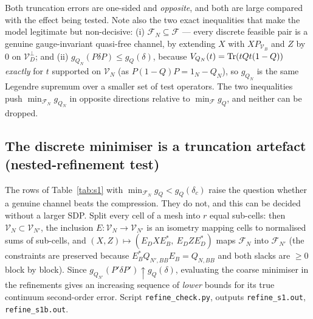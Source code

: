 \documentclass[11pt]{article}
\begin{document}
\noindent Both truncation errors are one-sided and \emph{opposite}, and both are large compared
with the effect being tested.  Note also the two exact inequalities that make the model legitimate
but non-decisive: (i) $\mathcal F_N\subseteq\mathcal F$ --- every discrete feasible pair is a genuine
gauge-invariant quasi-free channel, by extending $X$ with $XP_{\mathcal V_B}$ and $Z$ by $0$ on
$\mathcal V_D^\perp$; and (ii) $g_{Q_N}(P\delta P)\le g_Q(\delta)$, because
$V_{Q_N}(t)=\operatorname{Tr}(tQt(1-Q))$ \emph{exactly} for $t$ supported on $\mathcal V_N$ (as
$P(1-Q)P=1_N-Q_N$), so $g_{Q_N}$ is the same Legendre supremum over a smaller set of test
operators.  The two inequalities push $\min_{\mathcal F_N}g_{Q_N}$ in opposite directions relative
to $\min_{\mathcal F}g_Q$, and neither can be dropped.


\subsection{The discrete minimiser is a truncation artefact (nested-refinement test)}
\label{sec:refine}
The rows of Table~\ref{tab:s1} with $\min_{\mathcal F_N}g_Q<g_Q(\delta_c)$ raise the question
whether a genuine channel beats the compression.  They do not, and this can be decided without a
larger SDP.  Split every cell of a mesh into $r$ equal sub-cells: then
$\mathcal V_N\subset\mathcal V_{N'}$, the inclusion $E:\mathcal V_N\to\mathcal V_{N'}$ is an isometry
mapping cells to normalised sums of sub-cells, and $(X,Z)\mapsto(E_DXE_B^*,\ E_DZE_D^*)$ maps
$\mathcal F_N$ into $\mathcal F_{N'}$ (the constraints are preserved because
$E_B^*Q_{N',BB}E_B=Q_{N,BB}$ and both slacks are $\ge0$ block by block).  Since
$g_{Q_{N'}}(P'\delta P')\uparrow g_Q(\delta)$, evaluating the coarse minimiser in the refinements
gives an increasing sequence of \emph{lower} bounds for its true continuum second-order error.
Script \texttt{refine\_check.py}, outputs \texttt{refine\_s1.out}, \texttt{refine\_s1b.out}.
\end{document}

